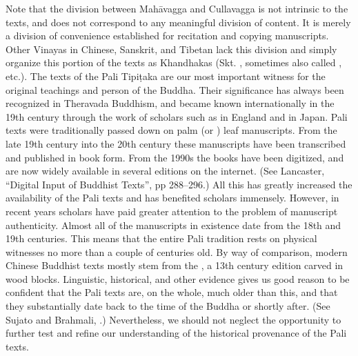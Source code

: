 {}Note that the division between Mahāvagga and Cullavagga is not intrinsic to the texts, and does not correspond to any meaningful division of content. It is merely a division of convenience established for recitation and copying manuscripts. Other Vinayas in Chinese, Sanskrit, and Tibetan lack this division and simply organize this portion of the texts as Khandhakas (Skt. , sometimes also called , etc.).\markdownRendererInterblockSeparator
{}\markdownRendererInterblockSeparator
{}The texts of the Pali Tipiṭaka are our most important witness for the original teachings and person of the Buddha. Their significance has always been recognized in Theravada Buddhism, and became known internationally in the 19th century through the work of scholars such as  in England and  in Japan.\markdownRendererInterblockSeparator
{}Pali texts were traditionally passed down on palm (or ) leaf manuscripts. From the late 19th century into the 20th century these manuscripts have been transcribed and published in book form. From the 1990s the books have been digitized, and are now widely available in several editions on the internet. (See Lancaster, “Digital Input of Buddhist Texts”, pp 288–296.) All this has greatly increased the availability of the Pali texts and has benefited scholars immensely.\markdownRendererInterblockSeparator
{}However, in recent years scholars have paid greater attention to the problem of manuscript authenticity. Almost all of the manuscripts in existence date from the 18th and 19th centuries. This means that the entire Pali tradition rests on physical witnesses no more than a couple of centuries old. By way of comparison, modern Chinese Buddhist texts mostly stem from the , a 13th century edition carved in wood blocks. Linguistic, historical, and other evidence gives us good reason to be confident that the Pali texts are, on the whole, much older than this, and that they substantially date back to the time of the Buddha or shortly after. (See Sujato and Brahmali, .) Nevertheless, we should not neglect the opportunity to further test and refine our understanding of the historical provenance of the Pali texts.\markdownRendererInterblockSeparator
